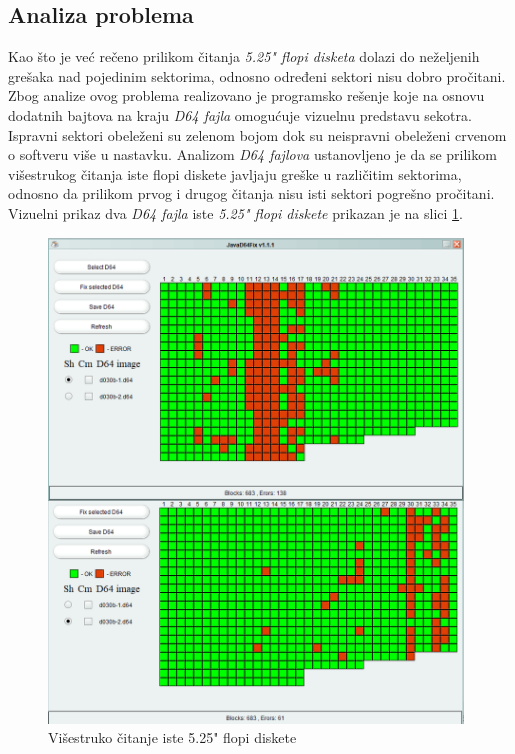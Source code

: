 \subsection{Analiza problema}

Kao što je već rečeno prilikom čitanja \textit{5.25" flopi disketa} dolazi do  \newline neželjenih grešaka nad pojedinim sektorima, odnosno određeni sektori nisu dobro pročitani. Zbog analize ovog problema realizovano je programsko rešenje koje na osnovu dodatnih bajtova na kraju \textit{D64 fajla} omogućuje vizuelnu predstavu sekotra. Ispravni sektori obeleženi su zelenom bojom dok su neispravni obeleženi crvenom o softveru više u nastavku. Analizom  \textit{D64 fajlova} ustanovljeno je da se prilikom višestrukog čitanja iste flopi diskete javljaju greške u različitim sektorima, odnosno da prilikom prvog i drugog čitanja nisu isti sektori pogrešno pročitani. Vizuelni prikaz dva  \textit{D64 fajla}  iste \textit{5.25" flopi diskete} prikazan je na slici \ref{img:visestrukoCitanje}.

\begin{figure}[ht]
\begin{center}
\includegraphics[width=11cm]{img/visestrukoCitanje.png}
\caption{Višestruko čitanje iste 5.25" flopi diskete}
\label{img:visestrukoCitanje}
\end{center}
\end{figure}
